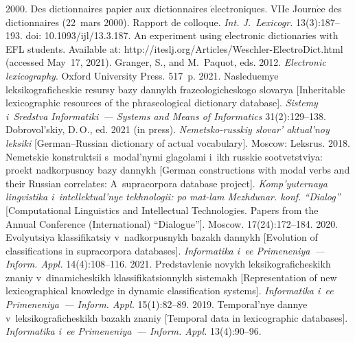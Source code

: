   \begin{multicols}{2}

\renewcommand{\bibname}{\protect\rmfamily References}

{\small\frenchspacing
 {%
 \begin{thebibliography}{99}
 2000. Des dictionnaires papier aux dictionnaires 
$\acute{\mbox{e}}$lectroniques. VIIe Journ$\acute{\mbox{e}}$e des dictionnaires 
(22~mars 2000). Rapport de colloque. \textit{Int. J.~Lexicogr.}  
13(3):187--193. doi: 10.1093/ijl/13.3.187.
  An experiment using electronic dictionaries 
with EFL students. Available at: {\sf  
http://iteslj.org/Articles/Weschler-ElectroDict.html} (accessed May~17, 2021).
Granger, S., and M.~Paquot, eds. 2012. \textit{Electronic lexicography}. Oxford 
University Press. 517~p.
 2021. Nasleduemye 
leksikograficheskie resursy bazy dannykh frazeologicheskogo slovarya 
[Inheritable lexicographic resources of the phraseological dictionary database]. 
\textit{Sistemy i~Sredstva Informatiki~--- Systems and Means of Informatics}  
31(2):129--138.
Dobrovol'skiy, D.\,O., ed. 2021 (in press). \textit{Nemetsko-russkiy slovar' 
aktual'noy leksiki} [German--Russian dictionary of actual vocabulary]. Moscow: 
Leksrus.
 2018. Ne\-me\-tskie konstruktsii 
s~modal'nymi glagolami i~ikh russkie sootvetstviya: proekt nadkorpusnoy bazy 
dannykh [German constructions with modal verbs and their Russian correlates: 
A~supracorpora database project]. \textit{Komp'yuternaya lingvistika 
i~intellektual'nye tekhnologii: po mat-lam Mezhdunar. konf. ``Dialog''} 
[Computational Linguistics and Intellectual Technologies. Papers from the Annual 
Conference (International) ``Dialogue'']. Moscow. 17(24):172--184.
 2020. 
Evolyutsiya klassifikatsiy v~nadkorpusnykh ba\-zakh dannykh [Evolution of 
classifications in supracorpora databases]. \textit{Informatika i~ee  
Primeneniya~--- Inform. Appl.} 14(4):108--116.
 2021. 
Predstavlenie novykh leksikograficheskikh znaniy v~dinamicheskikh 
klassifikatsionnykh sistemakh [Representation of new lexicographical knowledge 
in dynamic classification systems]. \textit{Informatika i~ee Primeneniya~--- 
Inform. Appl.} 15(1):82--89.
 2019. 
Temporal'nye dannye v~leksikograficheskikh bazakh znaniy [Temporal data in 
lexicographic databases]. \textit{Informatika i~ee Primeneniya~--- Inform. Appl.} 
13(4):90--96.
{

}
\end{thebibliography}}}
\end{multicols}
